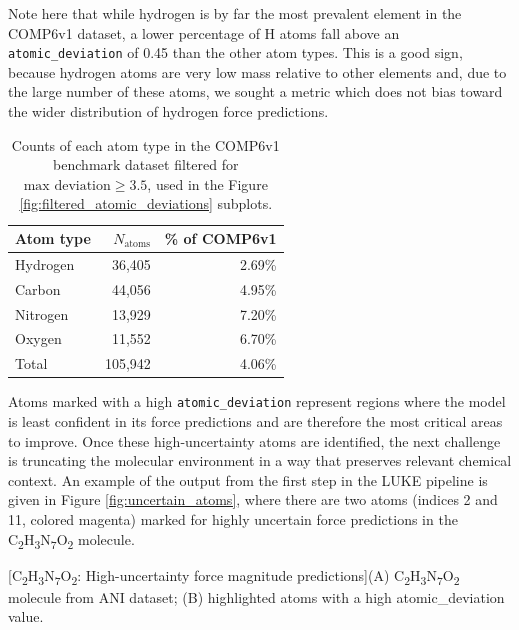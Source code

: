 Note here that while hydrogen is by far the most prevalent element in the COMP6v1 dataset, a lower percentage of H atoms fall above an \verb|atomic_deviation| of 0.45 than the other atom types.
This is a good sign, because hydrogen atoms are very low mass relative to other elements and, due to the large number of these atoms, we sought a metric which does not bias toward the wider distribution of hydrogen force predictions.

\begin{table}[h!]
\centering
\caption[Counts of each atom type in the filtered COMP6v1]{
Counts of each atom type in the COMP6v1 benchmark dataset filtered for $\text{max deviation} \geq 3.5$, used in the Figure \ref{fig:filtered_atomic_deviations} subplots.
}\label{tbl:filtered_comp6v1_atom_count}
\begin{tabularx}{0.4275\textwidth}{lrr}  
\toprule
Atom type & $N_\text{atoms}$ & \% of COMP6v1 \\
\midrule
Hydrogen & 36,405 & 2.69\% \\
Carbon & 44,056 & 4.95\% \\
Nitrogen & 13,929 & 7.20\% \\
Oxygen & 11,552 & 6.70\% \\
Total & 105,942 & 4.06\% \\
\bottomrule
\end{tabularx}
\end{table}

Atoms marked with a high \verb|atomic_deviation| represent regions where the model is least confident in its force predictions and are therefore the most critical areas to improve.
Once these high-uncertainty atoms are identified, the next challenge is truncating the molecular environment in a way that preserves relevant chemical context. 
An example of the output from the first step in the LUKE pipeline is given in Figure \ref{fig:uncertain_atoms}, where there are two atoms (indices 2 and 11, colored magenta) marked for highly uncertain force predictions in the C\textsubscript{2}H\textsubscript{3}N\textsubscript{7}O\textsubscript{2} molecule.

\begin{flushleft}
\begin{multiFigure}
\begin{centering}
[C\textsubscript{2}H\textsubscript{3}N\textsubscript{7}O\textsubscript{2}: High-uncertainty force magnitude predictions]{(A) C\textsubscript{2}H\textsubscript{3}N\textsubscript{7}O\textsubscript{2} molecule from ANI dataset; (B) highlighted atoms with a high atomic\_deviation value.
}
\label{fig:uncertain_atoms}
\end{centering}
\end{multiFigure}
\end{flushleft}

